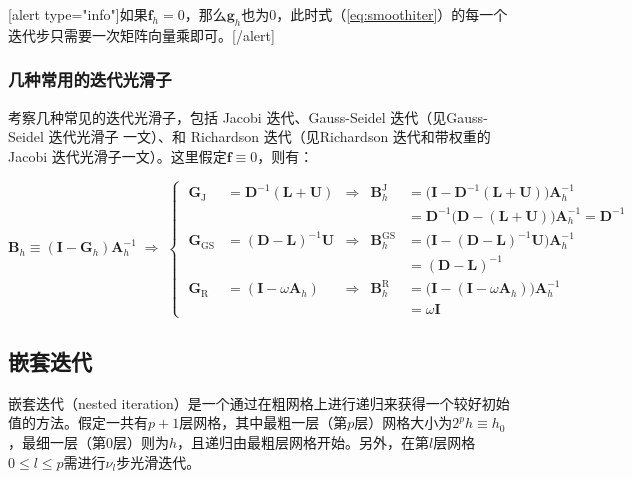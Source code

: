 \documentclass[12pt, UTF8, nofonts]{ctexart}
\begin{document}
[alert type="info"]如果$\boldsymbol{f}_h=0$，那么$\boldsymbol{g}_h$也为$0$，此时式（\ref{eq:smoothiter}）的每一个迭代步只需要一次矩阵向量乘即可。[/alert]

\subsubsection*{几种常用的迭代光滑子}

考察几种常见的迭代光滑子，包括 Jacobi 迭代、Gauss-Seidel 迭代（见Gauss-Seidel 迭代光滑子
一文）、和 Richardson 迭代（见Richardson 迭代和带权重的 Jacobi 迭代光滑子一文）。这里假定$\boldsymbol{f}\equiv0$，则有：

\[
  \boldsymbol{B}_{h} \equiv (\boldsymbol{I}-\boldsymbol{G}_h)\boldsymbol{A}_{h}^{-1} \;\Rightarrow\;
  \left\{\; \begin{array}{llcll}
    \boldsymbol{G}_{\mathrm{J}} &= \boldsymbol{D}^{-1}(\boldsymbol{L}+\boldsymbol{U}) &\Rightarrow&
    \boldsymbol{B}_{h}^{\mathrm{J}} &= \Big(\boldsymbol{I}-\boldsymbol{D}^{-1}(\boldsymbol{L}+\boldsymbol{U})\Big)\boldsymbol{A}_{h}^{-1} \\
    & & & &= \boldsymbol{D}^{-1}\Big(\boldsymbol{D}-(\boldsymbol{L}+\boldsymbol{U})\Big) \boldsymbol{A}_{h}^{-1} = \boldsymbol{D}^{-1} \\
    \boldsymbol{G}_{\mathrm{GS}} &= (\boldsymbol{D}-\boldsymbol{L})^{-1}\boldsymbol{U} &\Rightarrow&
    \boldsymbol{B}_{h}^{\mathrm{GS}} &=
    \Big(\boldsymbol{I}-(\boldsymbol{D}-\boldsymbol{L})^{-1}\boldsymbol{U}\Big)\boldsymbol{A}_{h}^{-1} \\
    & & & &=(\boldsymbol{D}-\boldsymbol{L})^{-1} \\
    \boldsymbol{G}_{\mathrm{R}} &= (\boldsymbol{I}-\omega\boldsymbol{A}_{h})
    &\Rightarrow& \boldsymbol{B}_{h}^{\mathrm{R}} &=
    \Big(\boldsymbol{I}-(\boldsymbol{I}-\omega\boldsymbol{A}_{h})\Big)\boldsymbol{A}_h^{-1} \\
    & & & &=\omega\boldsymbol{I}
  \end{array}\right.
\]

\subsection*{嵌套迭代}

嵌套迭代（nested iteration）是一个通过在粗网格上进行递归来获得一个较好初始值的方法。假定一共有$p+1$层网格，其中最粗一层（第$p$层）网格大小为$2^{p}h\equiv h_0$，最细一层（第$0$层）则为$h$，且递归由最粗层网格开始。另外，在第$l$层网格$0\leq l \leq p$需进行$\nu_l$步光滑迭代。
\end{document}
